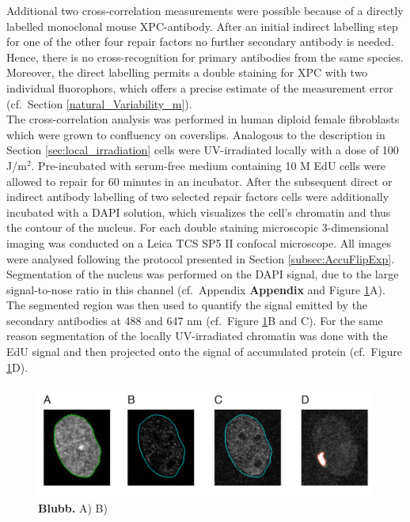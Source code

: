 Additional two cross-correlation measurements were possible because of a directly labelled monoclonal mouse XPC-antibody. After an initial indirect labelling step for one of the other four repair factors no further secondary antibody is needed. Hence, there is no cross-recognition for primary antibodies from the same species. Moreover, the direct labelling permits a double staining for XPC with two individual fluorophors, which offers a precise estimate of the measurement error (cf.\ Section \ref{natural_Variability_m}). \\
The cross-correlation analysis was performed in	human diploid female fibroblasts which were grown to confluency on coverslips. Analogous to the description in Section \ref{sec:local_irradiation} cells were UV-irradiated locally with a dose of 100 J/$\text{m}^\text{2}$. Pre-incubated with serum-free medium containing 10 \textmu M EdU cells were allowed to repair for 60 minutes in an incubator. After the subsequent direct or indirect antibody labelling of two selected repair factors cells were additionally incubated with a DAPI solution, which visualizes the cell's chromatin and thus the contour of the nucleus. For each double staining microscopic 3-dimensional imaging was conducted on a Leica TCS SP5 II confocal microscope. All images were analysed following the protocol presented in Section \ref{subsec:AccuFlipExp}. Segmentation of the nucleus was performed on the DAPI signal, due to the large signal-to-nose ratio in this channel (cf.\ Appendix \textbf{Appendix} and Figure \ref{fig:coStaining}A). The segmented region was then used to quantify the signal emitted by the secondary antibodies at 488 and 647 nm (cf.\ Figure \ref{fig:coStaining}B and C). For the same reason segmentation of the locally UV-irradiated chromatin was done with the EdU signal and then projected onto the signal of accumulated protein (cf.\ Figure \ref{fig:coStaining}D).   


\begin{figure}[htbp]
	\begin{center}
		\includegraphics[width=1\textwidth]{Abbildungen/figure4_1.pdf}
		\caption{\textbf{Blubb.} A) B) }
		\label{fig:coStaining}
	\end{center}
\end{figure}


